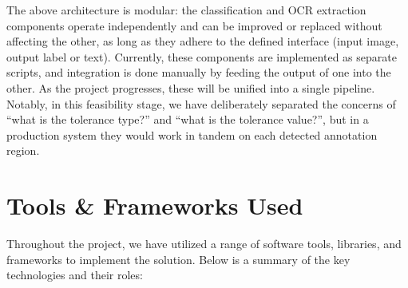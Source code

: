 \documentclass[11pt,a4paper]{article}
\begin{document}
The above architecture is modular: the classification and OCR extraction components operate independently and can be improved or replaced without affecting the other, as long as they adhere to the defined interface (input image, output label or text). Currently, these components are implemented as separate scripts, and integration is done manually by feeding the output of one into the other. As the project progresses, these will be unified into a single pipeline. Notably, in this feasibility stage, we have deliberately separated the concerns of “what is the tolerance type?” and “what is the tolerance value?”, but in a production system they would work in tandem on each detected annotation region.

\section{Tools \& Frameworks Used}
Throughout the project, we have utilized a range of software tools, libraries, and frameworks to implement the solution. Below is a summary of the key technologies and their roles:
\end{document}
